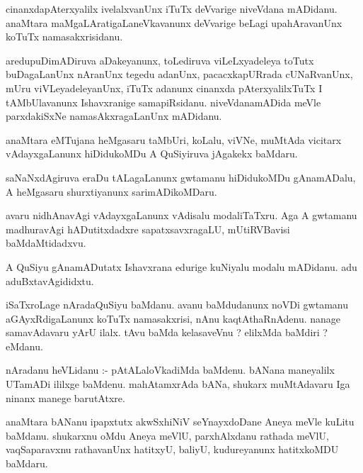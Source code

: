 \documentclass{article}
\begin{document}
\begin{mn}
cinanxdapAterxyalilx  ivelalxvanUnx  iTuTx  deVvarige  niveVdana  mADidanu.  anaMtara  maMgaLAratigaLaneVkavanunx  
deVvarige  beLagi  upahAravanUnx  koTuTx  namasakxrisidanu.
\end{mn}

\begin{mn}
aredupuDimADiruva  aDakeyanunx,  toLediruva  viLeLxyadeleya  toTutx  buDagaLanUnx  nAranUnx  tegedu  adanUnx,  
pacacxkapURrada  cUNaRvanUnx,  mUru  viVLeyadeleyanUnx,  iTuTx  adanunx  cinanxda  pAterxyalilxTuTx  I  
tAMbUlavanunx  Ishavxranige  samapiRsidanu.  niveVdanamADida  meVle  parxdakiSxNe  namasAkxragaLanUnx  mADidanu.
\end{mn}

\begin{mn}
anaMtara  eMTujana  heMgasaru  taMbUri,  koLalu,  viVNe,  muMtAda  vicitarx  vAdayxgaLanunx  hiDidukoMDu  
A  QuSiyiruva  jAgakekx  baMdaru.
\end{mn}

\begin{mn}
saNaNxdAgiruva  eraDu  tALagaLanunx  gwtamanu  hiDidukoMDu  gAnamADalu,  A  heMgasaru  shurxtiyanunx  sarimADikoMDaru.
\end{mn}

\begin{mn}
avaru  nidhAnavAgi  vAdayxgaLanunx  vAdisalu  modaliTaTxru.  Aga  A  gwtamanu  madhuravAgi  hADutitxdadxre  
sapatxsavxragaLU,  mUtiRVBavisi  baMdaMtidadxvu.
\end{mn}

\begin{mn}
A  QuSiyu  gAnamADutatx  Ishavxrana  edurige  kuNiyalu  modalu  mADidanu.  adu  aduBxtavAgididxtu.
\end{mn}

\begin{mn}
iSaTxroLage  nAradaQuSiyu  baMdanu.  avanu  baMdudanunx  noVDi  gwtamanu  aGAyxRdigaLanunx  koTuTx  namasakxrisi,  
nAnu  kaqtAthaRnAdenu.  nanage  samavAdavaru  yArU  ilalx.  tAvu  baMda  kelasaveVnu ?  elilxMda  baMdiri ?  eMdanu.
\end{mn}

\begin{mn}
nAradanu  heVLidanu :- pAtALaloVkadiMda  baMdenu.  bANana  maneyalilx  UTamADi  ililxge  baMdenu.  
mahAtamxrAda  bANa,  shukarx  muMtAdavaru  Iga  ninanx  manege  barutAtxre.
\end{mn}

\begin{mn}
anaMtara  bANanu  ipapxtutx  akwSxhiNiV  seYnayxdoDane  Aneya  meVle  kuLitu  baMdanu.  shukarxnu  
oMdu  Aneya  meVlU,  parxhAlxdanu  rathada  meVlU,  vaqSaparavxnu  rathavanUnx  hatitxyU,  baliyU,  
kudureyanunx  hatitxkoMDU  baMdaru.
\end{mn}
\end{document}
